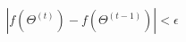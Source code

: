 \documentclass[preview]{standalone}
\begin{document}
\begin{align*}
|f(\Theta^{(t)}) - f(\Theta^{(t-1)})| < \epsilon
\end{align*}
\end{document}
